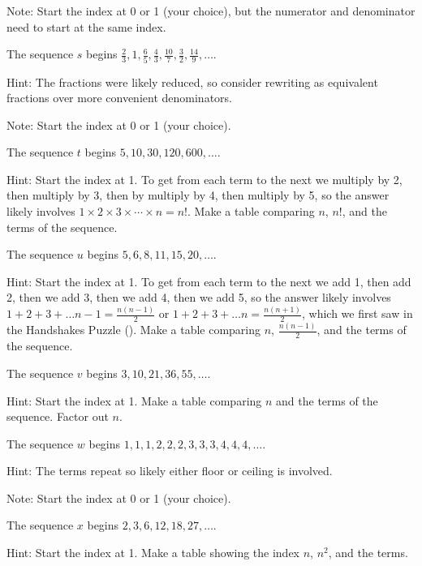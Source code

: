 \begin{act}
\begin{actpart}
            Note: Start the index at 0 or 1 (your choice), but the numerator and denominator need to start at the same index.

            \item The sequence $s$ begins $\frac{2}{3}, 1, \frac{6}{5}, \frac{4}{3}, \frac{10}{7}, \frac{3}{2}, \frac{14}{9}, \ldots$. 
            
            Hint: The fractions were likely reduced, so consider rewriting as equivalent fractions over more convenient denominators.

            Note: Start the index at 0 or 1 (your choice).
            
            \item The sequence $t$ begins $5, 10, 30, 120, 600, \ldots$. 
            
            Hint: Start the index at 1.  To get from each term to the next we multiply by 2, then multiply by 3, then by multiply by 4, then multiply by 5, so the answer likely involves $1 \times 2 \times 3 \times \cdots \times n = n!$.  Make a table comparing $n$, $n!$, and the terms of the sequence.
            
            \item The sequence $u$ begins $5, 6, 8, 11, 15, 20, \ldots$. 
            
            Hint: Start the index at 1. To get from each term to the next we add 1, then add 2, then we add 3, then we add 4, then we add 5, so the answer likely involves $1+2+3+ \ldots n-1=\frac{n(n-1)}{2}$ or $1+2+3+ \ldots n = \frac{n(n+1)}{2}$, which we first saw in the Handshakes Puzzle (). Make a table comparing $n$, $\frac{n(n-1)}{2}$, and the terms of the sequence.
            
            \item The sequence $v$ begins $3, 10, 21, 36, 55, \ldots $.  
            
            Hint: Start the index at 1.  Make a table comparing $n$ and the terms of the sequence.  Factor out $n$.  %

            \item The sequence $w$ begins $1,1,1,2,2,2,3,3,3,4,4,4, \ldots$.  
            
            Hint: The terms repeat so likely either floor or ceiling is involved.

            Note: Start the index at 0 or 1 (your choice).

            \item The sequence $x$ begins $2, 3, 6, 12, 18, 27, \ldots$.

            Hint: Start the index at 1. Make a table showing the index $n$, $n^2$, and the terms.
            
        \end{actpart}
\end{act}

